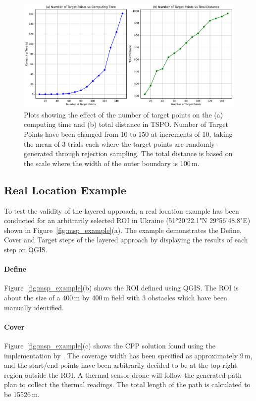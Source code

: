 \begin{figure}[h!]
    \centering
    \includegraphics[width=\linewidth]{figs/Jihwan/target_points_vs.pdf}
    \caption[Effect of Number of Target Points on Computing Time and Total Distance of TSP-O Solution]
    {Plots showing the effect of the number of target points on the (a) computing time and (b) total distance in \gls{TSPO}. Number of Target Points have been changed from 10 to 150 at increments of 10, taking the mean of 3 trials each where the target points are randomly generated through rejection sampling. The total distance is based on the scale where the width of the outer boundary is 100\,m.}
    \label{fig:msp_tspo_plot}
\end{figure}

\subsection{Real Location Example}
\label{sec:msp_example}

To test the validity of the layered approach, a real location example has been conducted for an arbitrarily selected \gls{ROI} in Ukraine (51°20'22.1"N 29°56'48.8"E) shown in Figure~\ref{fig:msp_example}(a). The example demonstrates the Define, Cover and Target steps of the layered approach by displaying the results of each step on \gls{QGIS}. 

\paragraph{Define} Figure~\ref{fig:msp_example}(b) shows the \gls{ROI} defined using \gls{QGIS}. The \gls{ROI} is about the size of a 400\,m by 400\,m field with 3 obstacles which have been manually identified.  

\paragraph{Cover} Figure~\ref{fig:msp_example}(c) shows the \gls{CPP} solution found using the implementation by \cite{bahnemann2021cpp}. The coverage width has been specified as approximately 9\,m, and the start/end points have been arbitrarily decided to be at the top-right region outside the \gls{ROI}. A thermal sensor drone will follow the generated path plan to collect the thermal readings. The total length of the path is calculated to be 15526\,m.

